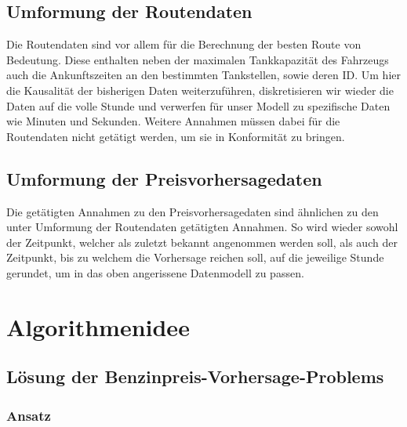 \documentclass[11pt]{article}
\begin{document}
\subsection{Umformung der Routendaten}
	Die Routendaten sind vor allem für die Berechnung der besten Route von Bedeutung. Diese enthalten neben der maximalen Tankkapazität des Fahrzeugs auch die Ankunftszeiten an den bestimmten Tankstellen, sowie deren ID. Um hier die Kausalität der bisherigen Daten weiterzuführen, diskretisieren wir wieder die Daten auf die volle Stunde und verwerfen für unser Modell zu spezifische  Daten wie Minuten und Sekunden. Weitere Annahmen müssen dabei für die Routendaten nicht getätigt werden, um sie in Konformität zu bringen.
\subsection{Umformung der Preisvorhersagedaten}
	Die getätigten Annahmen zu den Preisvorhersagedaten sind ähnlichen zu den unter \glqq Umformung der Routendaten\grqq{} getätigten Annahmen. So wird wieder sowohl der Zeitpunkt, welcher als zuletzt bekannt angenommen werden soll, als auch der Zeitpunkt, bis zu welchem die Vorhersage reichen soll, auf die jeweilige Stunde gerundet, um in das oben angerissene Datenmodell zu passen.



\section{Algorithmenidee}
\subsection{Lösung der Benzinpreis-Vorhersage-Problems}
\subsubsection{Ansatz}
	
\end{document}

